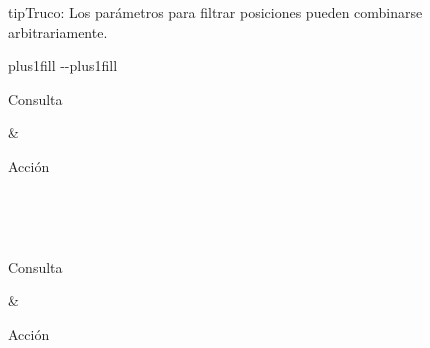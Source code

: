 \documentclass[letterpaper,10pt,spanish]{sphinxmanual}
\begin{document}
\begin{sphinxadmonition}{tip}{Truco:}
\sphinxAtStartPar
Los parámetros para filtrar posiciones pueden combinarse arbitrariamente.
\end{sphinxadmonition}


\begin{savenotes}
\sphinxatlongtablestart
\sphinxthistablewithglobalstyle
\makeatletter
  \LTleft \@totalleftmargin plus1fill
  \LTright\dimexpr\columnwidth-\@totalleftmargin-\linewidth\relax plus1fill
\makeatother
\begin{longtable}{}
\sphinxtoprule
\begin{varwidth}[t]{}
\sphinxstyletheadfamily \sphinxAtStartPar
Consulta
\sphinxbeforeendvarwidth
\end{varwidth}%
&\begin{varwidth}[t]{}
\sphinxstyletheadfamily \sphinxAtStartPar
Acción
\sphinxbeforeendvarwidth
\end{varwidth}%
\\
\sphinxmidrule
\endfirsthead

\\
\sphinxtoprule
\begin{varwidth}[t]{}
\sphinxstyletheadfamily \sphinxAtStartPar
Consulta
\sphinxbeforeendvarwidth
\end{varwidth}%
&\begin{varwidth}[t]{}
\sphinxstyletheadfamily \sphinxAtStartPar
Acción
\sphinxbeforeendvarwidth
\end{varwidth}%
\\
\sphinxmidrule
\endhead

\sphinxbottomrule
{}\\
\endfoot


\end{longtable}
\end{savenotes}
\end{document}
